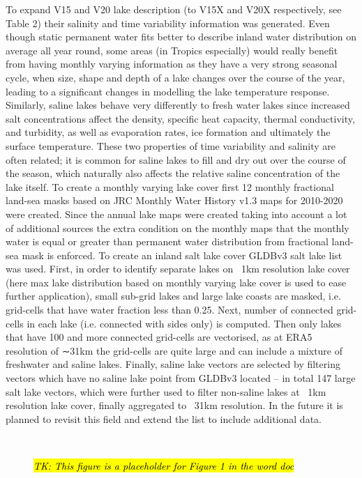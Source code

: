 \documentclass[hess, manuscript]{copernicus}
\begin{document}
To expand V15 and V20 lake description (to V15X and V20X respectively, see Table 2) their salinity and time variability information was generated. Even though static permanent water fits better to describe inland water distribution on average all year round, some areas (in Tropics especially) would really benefit from having monthly varying information as they have a very strong seasonal cycle, when size, shape and depth of a lake changes over the course of the year, leading to a significant changes in modelling the lake temperature response. Similarly, saline lakes behave very differently to fresh water lakes since increased salt concentrations affect the density, specific heat capacity, thermal conductivity, and turbidity, as well as evaporation rates, ice formation and ultimately the surface temperature. These two properties of time variability and salinity are often related; it is common for saline lakes to fill and dry out over the course of the season, which naturally also affects the relative saline concentration of the lake itself. To create a monthly varying lake cover first 12 monthly fractional land-sea masks based on JRC Monthly Water History v1.3 maps for 2010-2020 were created. Since the annual lake maps were created taking into account a lot of additional sources the extra condition on the monthly maps that the monthly water is equal or greater than permanent water distribution from fractional land-sea mask is enforced. To create an inland salt lake cover GLDBv3 salt lake list was used. First, in order to identify separate lakes on ~1km resolution lake cover (here max lake distribution based on monthly varying lake cover is used to ease further application), small sub-grid lakes and large lake coasts are masked, i.e. grid-cells that have water fraction less than 0.25. Next, number of connected grid-cells in each lake (i.e. connected with sides only) is computed. Then only lakes that have 100 and more connected grid-cells are vectorised, as at ERA5 resolution of ∼31km the grid-cells are quite large and can include a mixture of freshwater and saline lakes. Finally, saline lake vectors are selected by filtering vectors which have no saline lake point from GLDBv3 located – in total 147 large salt lake vectors, which were further used to filter non-saline lakes at ~1km resolution lake cover, finally aggregated to ~31km resolution. In the future it is planned to revisit this field and extend the list to include additional data.


\begin{figure}
	 \\
	\caption{\hl{\textit{TK: This figure is a placeholder for Figure 1 in the word doc}}} 
	\label{fig:example_figure_a}
\end{figure}
\end{document}
